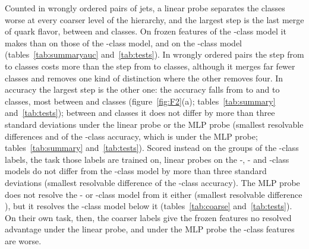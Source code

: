 Counted in wrongly ordered pairs of jets, a linear probe separates the \Kfull{} classes worse at every coarser
level of the hierarchy, and the largest step is the last merge of quark flavor, between \Kmid{} and \Kcoarse{}
classes. On frozen features of the \Kmid-class model it makes \MlstCmpJcTwoMidOverFullPr{} than on those of
the \Kfull-class model, and on the \Kcoarse-class model \MlstCmpJcTwoCoarseOverFullPr{}
(tables~\ref{tab:summaryauc} and~\ref{tab:tests}). In wrongly ordered pairs the step from \Kmid{} to \Kcoarse{}
classes costs more than the step from \Kres{} to \Kmid{} classes, although it merges far fewer classes and removes
one kind of distinction where the other removes four. In accuracy the largest step is the other one: the accuracy
falls from \Kres{} to \Kmid{} and to \Kcoarse{} classes, most between \Kres{} and \Kmid{} classes
(figure~\ref{fig:F2}(a); tables~\ref{tab:summary} and~\ref{tab:tests}); between \Kfull{} and \Kres{} classes it does
not differ by more than three standard deviations under the linear probe or the MLP probe (smallest resolvable
differences \MlstPwAccResLp{} and \MlstPwAccResMlp{} of the \Kfull-class accuracy, which is
\MlstPwAccResMlpRef{} under the MLP probe; tables~\ref{tab:summary} and~\ref{tab:tests}). Scored
instead on the \Kcoarse{} groups of the \Kcoarse-class labels, the task those labels are trained on, linear probes on
the \Kres-, \Kmid- and \Kcoarse-class models do not differ from the \Kfull-class model by more than three standard
deviations (smallest resolvable difference \MlstPwCoarseTask{} of the \Kfull-class accuracy). The MLP probe does
not resolve the \Kres- or \Kmid-class model from it either (smallest resolvable difference \MlstPwCoarseTaskMlp{}),
but it resolves the
\Kcoarse-class model below it (tables~\ref{tab:coarse} and~\ref{tab:tests}). On their own task, then, the coarser
labels give the frozen features no resolved advantage under the linear probe, and under the MLP probe the
\Kcoarse-class features are worse.

